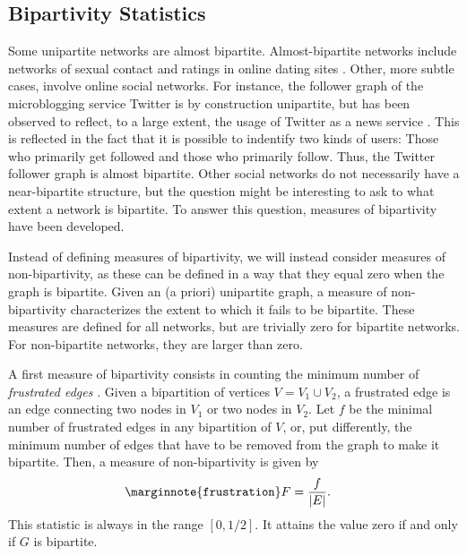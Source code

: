 \documentclass{article}
\begin{document}
\subsection{Bipartivity Statistics}
Some unipartite networks are almost bipartite.  Almost-bipartite
networks include networks of sexual contact \citep{b719} and ratings in
online dating sites \citep{b311,kunegis:split-complex-dating}.  Other,
more subtle cases, involve online social networks.  For instance, the
follower graph of the microblogging service Twitter is by construction
unipartite, but has been observed to reflect, to a large extent, the
usage of Twitter as a news service \citep{b545}. This is reflected in the
fact that it is possible to indentify two kinds of users: Those who
primarily get followed and those who primarily follow.  Thus, the
Twitter follower graph is almost bipartite.  Other social networks do
not necessarily have a near-bipartite structure, but the question might
be interesting to ask to what extent a network is bipartite.  To answer
this question, measures of bipartivity have been developed.

Instead of defining measures of bipartivity, we will instead consider
measures of non-bipartivity, as these can be defined in a way that they
equal zero when the graph is bipartite.  Given an (a priori) unipartite
graph, a measure of non-bipartivity characterizes the extent to which it
fails to be bipartite.  These measures are defined for all networks, but
are trivially zero for bipartite networks.  For non-bipartite networks,
they are larger than zero.

A first measure of bipartivity consists in counting the minimum number
of \emph{frustrated edges} \citep{b531}. Given a bipartition of vertices
$V=V_1\cup V_2$, a frustrated edge is an edge connecting two nodes in
$V_1$ or two nodes in $V_2$.  Let $f$ be the minimal number of
frustrated edges in any bipartition of $V$, or, put differently, the
minimum number of edges that have to be removed from the graph to make
it bipartite.  Then, a measure of non-bipartivity is given by
\begin{align}
  \marginnote{\texttt{frustration}} F &= \frac f {|E|}.
\end{align}
This statistic is always in the range $[0, 1/2]$.  It attains the value
zero if and only if $G$ is bipartite.
\end{document}
